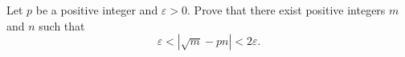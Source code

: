 Let $p$ be a positive integer and $\varepsilon>0$. Prove that there exist positive integers $m$ and $n$ such that
\[\varepsilon<\left|\sqrt m-pn\right|<2\varepsilon.\]
